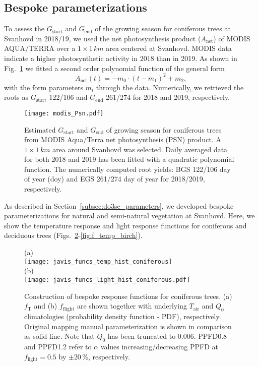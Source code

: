 \documentclass[bg, manuscript]{copernicus}
\begin{document}
\subsection{Bespoke parameterizations}

To assess the $G_\mathrm{start}$  and $G_\mathrm{end}$ of the growing season for coniferous trees at Svanhovd in 2018/19, we used the net photosynthesis product ($A_\mathrm{net}$) of MODIS AQUA/TERRA over a $1\times 1\,\unit{km}$ area centered at Svanhovd. MODIS data indicate a higher photosynthetic activity in 2018 than in 2019. As shown in Fig.~\ref{fig:modis_Psn} we fitted a second order polynomial function of the general form
%
\begin{equation}
A_\mathrm{net}(t) =  -m_0\cdot(t-m_1)^2+m_2,
\end{equation}
%
with the form parameters $m_i$ through the data. Numerically, we retrieved the roots as $G_\mathrm{start}$ 122/106 and $G_\mathrm{end}$ 261/274 for 2018 and 2019, respectively. 

\begin{figure}[th]
  \texttt{[image: modis\_Psn.pdf]}
  \caption{Estimated $G_\mathrm{start}$ and $G_\mathrm{end}$ of growing season for coniferous trees from MODIS Aqua/Terra net photosynthesis (PSN) product. A $1\times 1\,\unit{km}$ area around Svanhovd was selected. Daily averaged data for both 2018 and 2019 has been fitted with a quadratic polynomial function. The numerically computed root yields: BGS 122/106 day of year (\unit{doy}) and EGS 261/274 day of year for 2018/2019, respectively.}
  \label{fig:modis_Psn}
\end{figure}

As described in Section~\ref{subsec:do3se_parameters}, we developed bespoke parameterizations for natural and semi-natural vegetation at Svanhovd. Here, we show the temperature response and light response functions for coniferous and deciduous trees (Figs.~\ref{fig:f_temp_spruce}-\ref{fig:f_temp_birch}). 

\begin{figure}[t]
  \centering
  (a)\\
  \texttt{[image: javis\_funcs\_temp\_hist\_coniferous]}\\
  (b)\\
  \texttt{[image: javis\_funcs\_light\_hist\_coniferous.pdf]}
\caption{Construction of bespoke response functions for coniferous trees. (a) $f_\mathrm{T}$ and (b) $f_\mathrm{flight}$ are shown together with underlying $T_\mathrm{air}$ and $Q_0$ climatologies (probability density function - PDF), respectively. Original mapping manual parameterization is shown in comparison as solid line. Note that $Q_0$ has been truncated to $0.006$. PPFD0.8 and PPFD1.2 refer to $\alpha$ values increasing/decreasing PPFD at $f_\mathrm{light}=0.5$ by $\pm 20\,\%$, respectively.}
\label{fig:f_temp_spruce}
\end{figure}
\end{document}
